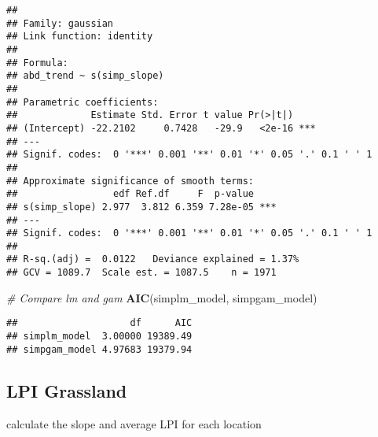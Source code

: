\documentclass[
]{article}
\newenvironment{Shaded}{\begin{snugshade}}{\end{snugshade}}
\newcommand{\CommentTok}[1]{\textcolor[rgb]{0.56,0.35,0.01}{\textit{#1}}}
\newcommand{\FunctionTok}[1]{\textcolor[rgb]{0.13,0.29,0.53}{\textbf{#1}}}
\newcommand{\NormalTok}[1]{#1}
\begin{document}
\begin{verbatim}
## 
## Family: gaussian 
## Link function: identity 
## 
## Formula:
## abd_trend ~ s(simp_slope)
## 
## Parametric coefficients:
##             Estimate Std. Error t value Pr(>|t|)    
## (Intercept) -22.2102     0.7428   -29.9   <2e-16 ***
## ---
## Signif. codes:  0 '***' 0.001 '**' 0.01 '*' 0.05 '.' 0.1 ' ' 1
## 
## Approximate significance of smooth terms:
##                 edf Ref.df     F  p-value    
## s(simp_slope) 2.977  3.812 6.359 7.28e-05 ***
## ---
## Signif. codes:  0 '***' 0.001 '**' 0.01 '*' 0.05 '.' 0.1 ' ' 1
## 
## R-sq.(adj) =  0.0122   Deviance explained = 1.37%
## GCV = 1089.7  Scale est. = 1087.5    n = 1971
\end{verbatim}

\begin{Shaded}
\begin{Highlighting}[]
\CommentTok{\# Compare lm and gam}
\FunctionTok{AIC}\NormalTok{(simplm\_model, simpgam\_model)}
\end{Highlighting}
\end{Shaded}

\begin{verbatim}
##                    df      AIC
## simplm_model  3.00000 19389.49
## simpgam_model 4.97683 19379.94
\end{verbatim}

\subsection{LPI Grassland}\label{lpi-grassland}

calculate the slope and average LPI for each location
\end{document}
